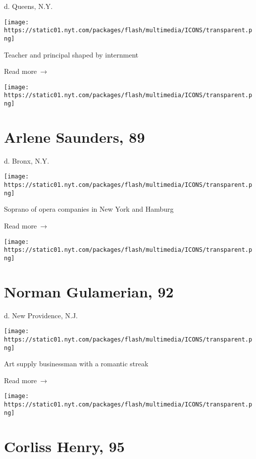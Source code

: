 d. Queens, N.Y.

\texttt{[image: https://static01.nyt.com/packages/flash/multimedia/ICONS/transparent.png]}

Teacher and principal shaped by internment

 Read more~→

\href{https://www.nytimes.com/2020/04/29/obituaries/arlene-saunders-dead-coronavirus.html}{}

\texttt{[image: https://static01.nyt.com/packages/flash/multimedia/ICONS/transparent.png]}

\hypertarget{arlene-saunders-89}{%
\section{Arlene Saunders, 89}\label{arlene-saunders-89}}

d. Bronx, N.Y.

\texttt{[image: https://static01.nyt.com/packages/flash/multimedia/ICONS/transparent.png]}

Soprano of opera companies in New York and Hamburg

 Read more~→

\href{https://www.nytimes.com/2020/04/28/nyregion/norman-gulamerian-dead-coronavirus.html}{}

\texttt{[image: https://static01.nyt.com/packages/flash/multimedia/ICONS/transparent.png]}

\hypertarget{norman-gulamerian-92}{%
\section{Norman Gulamerian, 92}\label{norman-gulamerian-92}}

d. New Providence, N.J.

\texttt{[image: https://static01.nyt.com/packages/flash/multimedia/ICONS/transparent.png]}

Art supply businessman with a romantic streak

 Read more~→

\href{https://www.nytimes.com/2020/04/28/obituaries/corliss-henry-dead-coronavirus.html}{}

\texttt{[image: https://static01.nyt.com/packages/flash/multimedia/ICONS/transparent.png]}

\hypertarget{corliss-henry-95}{%
\section{Corliss Henry, 95}\label{corliss-henry-95}}


